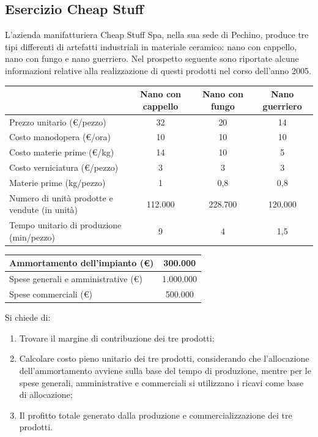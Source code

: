 \documentclass{article}
\begin{document}
\subsection{Esercizio Cheap Stuff}
L'azienda manifatturiera Cheap Stuff Spa, nella sua sede di Pechino, produce tre tipi differenti di artefatti industriali in materiale ceramico: nano con cappello, nano con fungo e nano guerriero. Nel prospetto seguente sono riportate alcune informazioni relative alla realizzazione di questi prodotti nel corso dell'anno 2005.
\begin{center}
    \begin{tabular}{|l|c|c|c|}
        \hline
        & Nano con cappello & Nano con fungo & Nano guerriero\\ \hline
        Prezzo unitario (€/pezzo)&32&20&14 \\ \hline
        Costo manodopera (€/ora)&10&10&10 \\ \hline
        Costo materie prime (€/kg)&14&10&5 \\ \hline
        Costo verniciatura (€/pezzo)&3&3&3 \\ \hline
        Materie prime (kg/pezzo)&1&0,8&0,8 \\ \hline
        Numero di unità prodotte e vendute (in unità)&112.000&228.700&120.000 \\ \hline
        Tempo unitario di produzione (min/pezzo)&9&4&1,5 \\ \hline
    \end{tabular}
\end{center}
\begin{center}
    \begin{tabular}{|l|c|}
        \hline
        Ammortamento dell'impianto (€)&300.000 \\ \hline
        Spese generali e amministrative (€)&1.000.000 \\ \hline
        Spese commerciali (€)&500.000 \\ \hline
    \end{tabular}
\end{center}
Si chiede di:
\begin{enumerate}
    \item Trovare il margine di contribuzione dei tre prodotti;
    \item Calcolare costo pieno unitario dei tre prodotti, considerando che l'allocazione dell'ammortamento avviene sulla base del tempo di produzione, mentre per le spese generali, amministrative e commerciali si utilizzano i ricavi come base di allocazione;
    \item Il profitto totale generato dalla produzione e commercializzazione dei tre prodotti.
\end{enumerate}
\end{document}
